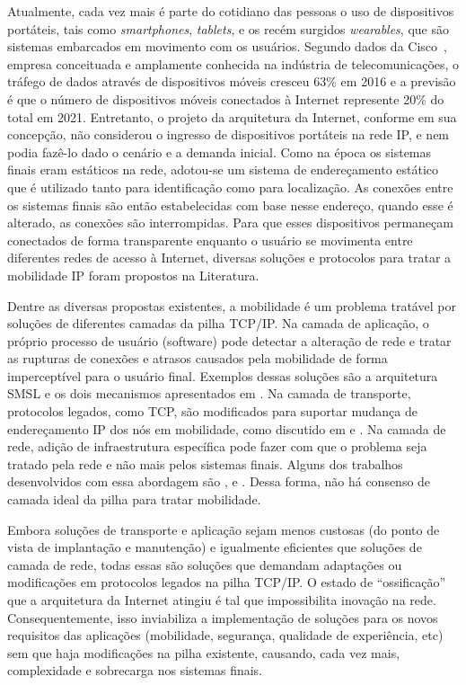 \documentclass[	12pt, Times, openright, twoside, a4paper, english, brazil]{abntex2}
\begin{document}
\par Atualmente, cada vez mais é parte do cotidiano das pessoas o uso de dispositivos portáteis, tais como \textit{smartphones}, \textit{tablets}, e os recém surgidos \textit{wearables}, que são sistemas embarcados em movimento com os usuários. Segundo dados da Cisco~\cite{CISCO2017}, empresa conceituada e amplamente conhecida na indústria de telecomunicações, o tráfego de dados através de dispositivos móveis cresceu 63\% em 2016 e a previsão é que o número de dispositivos móveis conectados à Internet represente 20\% do total em 2021. Entretanto, o projeto da arquitetura da Internet, conforme em sua concepção, não considerou o ingresso de dispositivos portáteis na rede IP, e nem podia fazê-lo dado o cenário e a demanda inicial. Como na época os sistemas finais eram estáticos na rede, adotou-se um sistema de endereçamento estático que é utilizado tanto para identificação como para localização. As conexões entre os sistemas finais são então estabelecidas com base nesse endereço, quando esse é alterado, as conexões são interrompidas. Para que esses dispositivos permaneçam conectados de forma transparente enquanto o usuário se movimenta entre diferentes redes de acesso à Internet, diversas soluções e protocolos para tratar a mobilidade IP foram propostos na Literatura.

\par Dentre as diversas propostas existentes, a mobilidade é um problema tratável por soluções de diferentes camadas da pilha TCP/IP. Na camada de aplicação, o próprio processo de usuário (software) pode detectar a alteração de rede e tratar as rupturas de conexões e atrasos causados pela mobilidade de forma imperceptível para o usuário final. Exemplos dessas soluções são a arquitetura SMSL \cite{smsl} e os dois mecanismos apresentados em \cite{rockracks}. Na camada de transporte, protocolos legados, como TCP, são modificados para suportar mudança de endereçamento IP dos nós em mobilidade, como discutido em \cite{tcpmigrate} e \cite{snoeren}. Na camada de rede, adição de infraestrutura específica pode fazer com que o problema seja tratado pela rede e não mais pelos sistemas finais. Alguns dos trabalhos desenvolvidos com essa abordagem são \cite{avelar2013}, \cite{rfc3220} e \cite{rfc3775}. Dessa forma, não há consenso de camada ideal da pilha para tratar mobilidade. 

Embora soluções de transporte e aplicação sejam menos custosas (do ponto de vista de implantação e manutenção) e igualmente eficientes que soluções de camada de rede, todas essas são soluções que demandam adaptações ou modificações em protocolos legados na pilha TCP/IP. O estado de ``ossificação'' que a arquitetura da Internet atingiu é tal que impossibilita inovação na rede. Consequentemente, isso inviabiliza a implementação de soluções para os novos requisitos das aplicações (mobilidade, segurança, qualidade de experiência, etc) sem que haja modificações na pilha existente, causando, cada vez mais, complexidade e sobrecarga nos sistemas finais.
\end{document}
